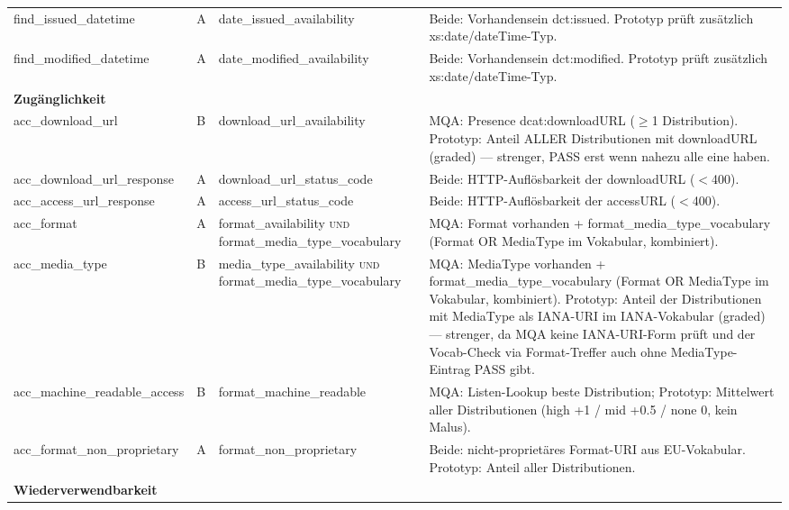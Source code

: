 \begin{longtable}{p{3.1cm} p{0.7cm} p{3.6cm} p{6.8cm}}
find\_issued\_datetime & A & date\_issued\_availability & Beide: Vorhandensein dct:issued. Prototyp prüft zusätzlich xs:date/dateTime-Typ. \\

find\_modified\_datetime & A & date\_modified\_availability & Beide: Vorhandensein dct:modified. Prototyp prüft zusätzlich xs:date/dateTime-Typ. \\


\multicolumn{4}{l}{\textbf{Zugänglichkeit}} \\
\midrule

acc\_download\_url & B & download\_url\_availability & MQA: Presence dcat:downloadURL ($\geq$1 Distribution). Prototyp: Anteil ALLER Distributionen mit downloadURL (graded) — strenger, PASS erst wenn nahezu alle eine haben. \\

acc\_download\_url\_response & A & download\_url\_status\_code & Beide: HTTP-Auflösbarkeit der downloadURL ($<$400). \\

acc\_access\_url\_response & A & access\_url\_status\_code & Beide: HTTP-Auflösbarkeit der accessURL ($<$400). \\

acc\_format & A & format\_availability \textsc{und} format\_media\_type\_vocabulary & MQA: Format vorhanden + format\_media\_type\_vocabulary (Format OR MediaType im Vokabular, kombiniert).  \\

acc\_media\_type & B & media\_type\_availability \textsc{und} format\_media\_type\_vocabulary & MQA: MediaType vorhanden + format\_media\_type\_vocabulary (Format OR MediaType im Vokabular, kombiniert). Prototyp: Anteil der Distributionen mit MediaType als IANA-URI im IANA-Vokabular (graded) — strenger, da MQA keine IANA-URI-Form prüft und der Vocab-Check via Format-Treffer auch ohne MediaType-Eintrag PASS gibt. \\

acc\_machine\_readable\_access & B & format\_machine\_readable & MQA: Listen-Lookup beste Distribution; Prototyp: Mittelwert aller Distributionen (high +1 / mid +0.5 / none 0, kein Malus). \\

acc\_format\_non\_proprietary & A & format\_non\_proprietary & Beide: nicht-proprietäres Format-URI aus EU-Vokabular. Prototyp: Anteil aller Distributionen. \\


\multicolumn{4}{l}{\textbf{Wiederverwendbarkeit}} \\
\midrule


\end{longtable}
